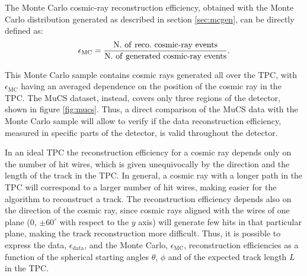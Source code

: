 \documentclass[a4paper,11pt]{article}
\def\myhyphen{{\hbox{-}}}
\begin{document}



The Monte Carlo cosmic-ray reconstruction efficiency, obtained with the Monte Carlo distribution generated as described in section \ref{sec:mcgen}, can be directly defined as:
\begin{equation}
  \epsilon_{\mathrm{MC}} = \frac{\mathrm{N.~of~reco.~cosmic\myhyphen ray~events}}{\mathrm{N.~of~generated~cosmic\myhyphen ray~events}}.
\end{equation}

This Monte Carlo sample contains cosmic rays generated all over the TPC, with $\epsilon_{\mathrm{MC}}$ having an averaged dependence on the position of the cosmic ray in the TPC. The MuCS dataset, instead, covers only three regions of the detector, shown in figure \ref{fig:mucs}. Thus, a direct comparison of the MuCS data with the Monte Carlo sample will allow to verify if the data reconstruction efficiency, measured in specific parts of the detector, is valid throughout the detector.

In an ideal TPC the reconstruction efficiency for a cosmic ray depends only on the number of hit wires, which is given unequivocally by the direction and the length of the track in the TPC. In general, a cosmic ray with a longer path in the TPC will correspond to a larger number of hit wires, making easier for the algorithm to reconstruct a track. The reconstruction efficiency depends also on the direction of the cosmic ray, since cosmic rays aligned with the wires of one plane (0, $\pm60^{\circ}$ with respect to the $y$ axis) will generate few hits in that particular plane, making the track reconstruction more difficult.
Thus, it is possible to express the data, $\epsilon_{\mathrm{data}}$, and the Monte Carlo, $\epsilon_{\mathrm{MC}}$, reconstruction efficiencies as a function of the spherical starting angles $\theta$, $\phi$ and of the expected track length $L$ in the TPC.
\end{document}
